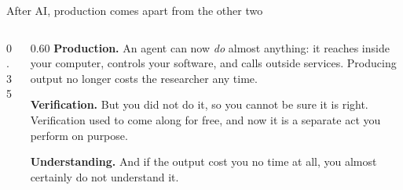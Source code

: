 \documentclass[aspectratio=169,11pt]{beamer}
\begin{document}
\begin{frame}{After AI, production comes apart from the other two}
\vspace{-0.2em}
\begin{columns}[T,onlytextwidth]
\begin{column}{0.35\textwidth}
\vspace{1.6em}
\begin{center}
\end{center}
\end{column}
\begin{column}{0.60\textwidth}
{\color{mitcardinal}\bfseries\small Production.}
{\footnotesize An agent can now \emph{do} almost anything: it reaches inside your computer, controls your software, and calls outside services. Producing output no longer costs the researcher any time.}
\vspace{0.5em}

{\color{mitcardinal}\bfseries\small Verification.}
{\footnotesize But you did not do it, so you cannot be sure it is right. Verification used to come along for free, and now it is a separate act you perform on purpose.}
\vspace{0.5em}

{\color{mitcardinal}\bfseries\small Understanding.}
{\footnotesize And if the output cost you no time at all, you almost certainly do not understand it.}
\end{column}
\end{columns}
\end{frame}
\end{document}
